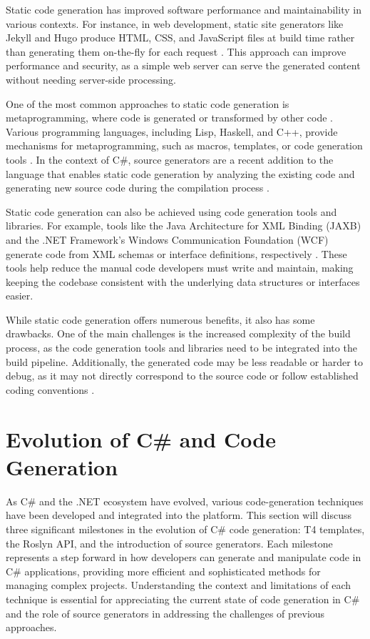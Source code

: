 Static code generation has improved software performance and maintainability in various contexts. For instance, in web development, static site generators like Jekyll and Hugo produce HTML, CSS, and JavaScript files at build time rather than generating them on-the-fly for each request \cite{Biilmann2015}. This approach can improve performance and security, as a simple web server can serve the generated content without needing server-side processing.

One of the most common approaches to static code generation is metaprogramming, where code is generated or transformed by other code \cite{Cordy1992}. Various programming languages, including Lisp, Haskell, and C++, provide mechanisms for metaprogramming, such as macros, templates, or code generation tools \cite{Cordy1992}. In the context of C\#, source generators are a recent addition to the language that enables static code generation by analyzing the existing code and generating new source code during the compilation process \cite{Microsoft2022SourceGenerators}.

Static code generation can also be achieved using code generation tools and libraries. For example, tools like the Java Architecture for XML Binding (JAXB) and the .NET Framework's Windows Communication Foundation (WCF) generate code from XML schemas or interface definitions, respectively \cite{Vogel2023, Microsoft2021WhatLearn}. These tools help reduce the manual code developers must write and maintain, making keeping the codebase consistent with the underlying data structures or interfaces easier.

While static code generation offers numerous benefits, it also has some drawbacks. One of the main challenges is the increased complexity of the build process, as the code generation tools and libraries need to be integrated into the build pipeline. Additionally, the generated code may be less readable or harder to debug, as it may not directly correspond to the source code or follow established coding conventions \cite{Chiba2000}.


\section{Evolution of C\# and Code Generation}

As C\# and the .NET ecosystem have evolved, various code-generation techniques have been developed and integrated into the platform. This section will discuss three significant milestones in the evolution of C\# code generation: T4 templates, the Roslyn API, and the introduction of source generators. Each milestone represents a step forward in how developers can generate and manipulate code in C\# applications, providing more efficient and sophisticated methods for managing complex projects. Understanding the context and limitations of each technique is essential for appreciating the current state of code generation in C\# and the role of source generators in addressing the challenges of previous approaches.


